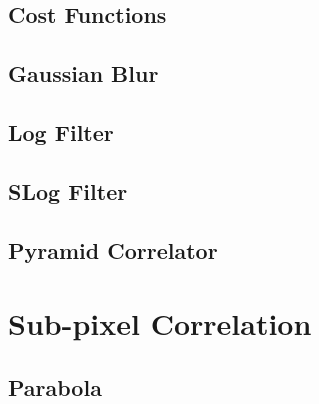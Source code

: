 \subsection{Cost Functions}

\subsection{Gaussian Blur}

\subsection{Log Filter}

\subsection{SLog Filter}

\subsection{Pyramid Correlator}

\section{Sub-pixel Correlation}
\label{sec:subpixel_correlation}

\subsection{Parabola}

